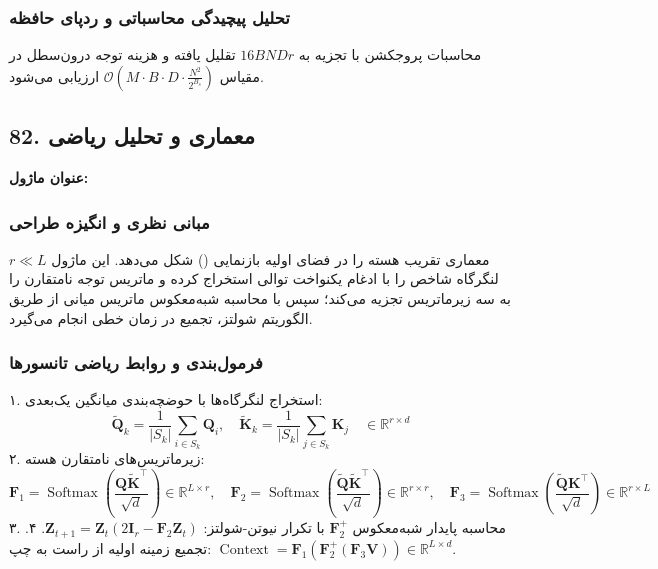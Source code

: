 \subsubsection*{تحلیل پیچیدگی محاسباتی و ردپای حافظه}
محاسبات پروجکشن با تجزیه  به $16 B N D r$ تقلیل یافته و هزینه توجه درون‌سطل در مقیاس $\mathcal{O}\left(M \cdot B \cdot D \cdot \frac{N^2}{2^{B_s}}\right)$ ارزیابی می‌شود.


\subsection*{82. معماری و تحلیل ریاضی }
\textbf{عنوان ماژول:} 

\subsubsection*{مبانی نظری و انگیزه طراحی}
معماری  تقریب هسته را در فضای اولیه بازنمایی () شکل می‌دهد. این ماژول $r \ll L$ لنگرگاه شاخص را با ادغام یکنواخت توالی استخراج کرده و ماتریس توجه نامتقارن را به سه زیرماتریس تجزیه می‌کند؛ سپس با محاسبه شبه‌معکوس ماتریس میانی از طریق الگوریتم شولتز، تجمیع در زمان خطی انجام می‌گیرد.

\subsubsection*{فرمول‌بندی و روابط ریاضی تانسورها}
۱. استخراج لنگرگاه‌ها با حوضچه‌بندی میانگین یک‌بعدی:
\begin{equation}
\widetilde{\mathbf{Q}}_k = \frac{1}{|S_k|} \sum_{i \in S_k} \mathbf{Q}_i, \quad \widetilde{\mathbf{K}}_k = \frac{1}{|S_k|} \sum_{j \in S_k} \mathbf{K}_j \quad \in \mathbb{R}^{r \times d}
\end{equation}
۲. زیرماتریس‌های نامتقارن هسته:
\begin{equation}
\mathbf{F}_1 = \operatorname{Softmax}\left(\frac{\mathbf{Q} \widetilde{\mathbf{K}}^\top}{\sqrt{d}}\right) \in \mathbb{R}^{L \times r}, \quad \mathbf{F}_2 = \operatorname{Softmax}\left(\frac{\widetilde{\mathbf{Q}} \widetilde{\mathbf{K}}^\top}{\sqrt{d}}\right) \in \mathbb{R}^{r \times r}, \quad \mathbf{F}_3 = \operatorname{Softmax}\left(\frac{\widetilde{\mathbf{Q}} \mathbf{K}^\top}{\sqrt{d}}\right) \in \mathbb{R}^{r \times L}
\end{equation}
۳. محاسبه پایدار شبه‌معکوس $\mathbf{F}_2^+$ با تکرار نیوتن-شولتز: $\mathbf{Z}_{t+1} = \mathbf{Z}_t (2 \mathbf{I}_r - \mathbf{F}_2 \mathbf{Z}_t)$.
۴. تجمیع زمینه اولیه از راست به چپ: $\operatorname{Context} = \mathbf{F}_1 \left( \mathbf{F}_2^+ \left( \mathbf{F}_3 \mathbf{V} \right) \right) \in \mathbb{R}^{L \times d}$.

